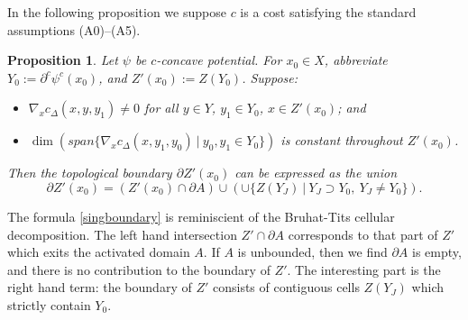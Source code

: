 \documentclass[12pt]{amsart}
\newtheorem{prop}{Proposition}
\theoremstyle{definition}
\theoremstyle{remark}
\newcommand{\del}{\partial}
\newcommand{\cd}{c_\Delta}
\begin{document}
\title{}


\author{J. H. Martel}
\date{\today}
\maketitle

\begin{abstract}


\end{abstract}
\tableofcontents














In the following proposition we suppose $c$ is a cost satisfying the standard assumptions (A0)--(A5).
\begin{prop}
Let $\psi$ be $c$-concave potential. For $x_0 \in X$, abbreviate $Y_0:=\del^c \psi^c (x_0)$, and $Z'(x_0):=Z(Y_0)$. Suppose:
\begin{itemize}
\item $\nabla_x \cd(x,y,y_1)\neq 0$ for all $y\in Y$, $y_1\in Y_0$, $x\in Z'(x_0)$; and
\item $\dim (span\{\nabla_x\cd(x,y_1,y_0)~|~y_0, y_1 \in Y_0\})$ is constant throughout $Z'(x_0)$.
\end{itemize}
Then the topological boundary $\del Z'(x_0)$ can be expressed as the union \begin{equation}
\del Z'(x_0)=(Z'(x_0) \cap \del A) \cup (\cup \{ Z(Y_J) ~|~Y_J \supset Y_0, ~Y_J \neq Y_0\}).\label{singboundary}\end{equation}

\label{singboundprop}
\end{prop}

The formula \ref{singboundary} is reminiscient of the Bruhat-Tits cellular decomposition. The left hand intersection $Z' \cap \del A$ corresponds to that part of $Z'$ which exits the activated domain $A$. If $A$ is unbounded, then we find $\del A$ is empty, and there is no contribution to the boundary of $Z'$. The interesting part is the right hand term: the boundary of $Z'$ consists of contiguous cells $Z(Y_J)$ which strictly contain $Y_0$. 
\end{document}
